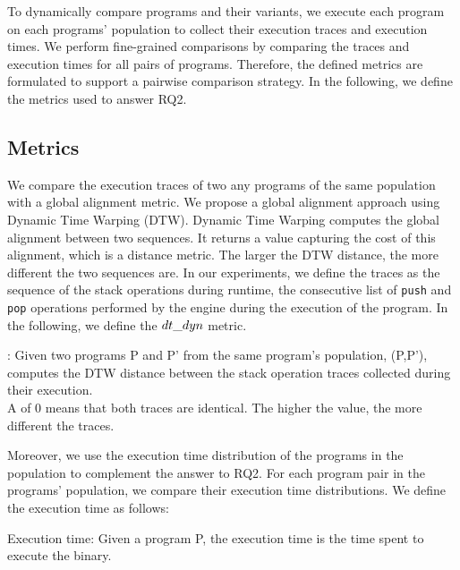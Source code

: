 To dynamically compare programs and their variants, we execute each program on each programs' population to collect their execution traces and execution times. We perform fine-grained comparisons by comparing the traces and execution times for all pairs of programs. Therefore, the defined metrics are formulated to support a pairwise comparison strategy.
In the following, we define the metrics used to answer RQ2.

\subsection*{Metrics}

We compare the execution traces of two any programs of the same population with a global alignment metric. We propose a global alignment approach using Dynamic Time Warping (DTW). 
Dynamic Time Warping \cite{Maia08usinga} computes the global alignment between two sequences. It returns a value capturing the cost of this alignment, which is a distance metric. The larger the DTW distance, the more different the two sequences are.
In our experiments, we define the traces as the sequence of the stack operations during runtime, \ie the consecutive list of \texttt{push} and \texttt{pop} operations performed by the \wasm engine during the execution of the program.
In the following, we define the $dt\_dyn$ metric. 
 

\begin{metric}{\DTW{}:}
\label{metric:stack}
	Given two programs P and P' from the same program's population, \DTW{}(P,P'), computes the DTW distance between the stack operation traces collected during their execution. \\
	A \DTW{} of $0$ means that both traces are identical.
	The higher the value, the more different the traces. 
\end{metric}



Moreover, we use the execution time distribution of the programs in the population to complement the answer to RQ2. For each program pair in the programs' population, we compare their execution time distributions. We define the execution time as follows:

\begin{metric}{Execution time:}\label{metric:time}
	Given a \wasm program P, the execution time is the time spent to execute the binary.
\end{metric}





